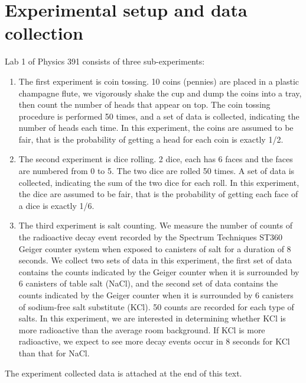 \documentclass[11pt]{book}
\theoremstyle{break}
\theoremstyle{break}
\begin{document}
\section{Experimental setup and data collection}
Lab 1 of Physics 391 consists of three sub-experiments:
\begin{enumerate}
\item The first experiment is coin tossing. 10 coins (pennies) are placed in a plastic champagne flute, we vigorously shake the cup and dump the coins into a tray, then count the number of heads that appear on top. The coin tossing procedure is performed 50 times, and a set of data is collected, indicating the number of heads each time. In this experiment, the coins are assumed to be fair, that is the probability of getting a head for each coin is exactly 1/2.
\item  The second experiment is dice rolling. 2 dice, each has 6 faces and the faces are numbered from 0 to 5. The two dice are rolled 50 times. A set of data is collected, indicating the sum of the two dice for each roll. In this experiment, the dice are assumed to be fair, that is the probability of getting each face of a dice is exactly 1/6. 
\item The third experiment is salt counting. We measure the number of 
counts of the radioactive decay event recorded by the Spectrum Techniques ST360 Geiger counter system when exposed to canisters of salt for a duration of 8 seconds. We collect two sets of data in this experiment, the first set of data contains the counts indicated by the Geiger counter when it is surrounded by 6 canisters of table salt (NaCl), and the second set of data contains the counts indicated by the Geiger counter when it is surrounded by 6 canisters of sodium-free salt substitute (KCl). 50 counts are recorded for each type of salts. In this experiment, we are interested in determining whether KCl is more radioactive than the average room background. If KCl is more radioactive, we expect to see more decay events occur in 8 seconds for KCl than that for NaCl.
\end{enumerate}

The experiment collected data is attached at the end of this text.
\newpage
\end{document}

